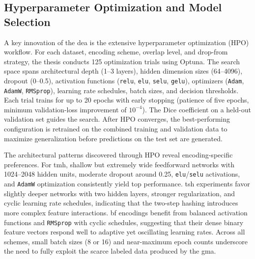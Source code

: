 \documentclass[a4paper,11pt]{scrartcl}
\begin{document}
\subsection{Hyperparameter Optimization and Model Selection}
A key innovation of the \ac{dea} is the extensive hyperparameter optimization (HPO) workflow. For each dataset, encoding scheme, overlap level, and drop-from strategy, the thesis conducts 125 optimization trials using Optuna. The search space spans architectural depth (1--3 layers), hidden dimension sizes (64--4096), dropout (0--0.5), activation functions (\texttt{relu}, \texttt{elu}, \texttt{selu}, \texttt{gelu}), optimizers (\texttt{Adam}, \texttt{AdamW}, \texttt{RMSprop}), learning rate schedules, batch sizes, and decision thresholds. Each trial trains for up to 20 epochs with early stopping (patience of five epochs, minimum validation-loss improvement of $10^{-4}$). The Dice coefficient on a held-out validation set guides the search. After HPO converges, the best-performing configuration is retrained on the combined training and validation data to maximize generalization before predictions on the test set are generated.

The architectural patterns discovered through HPO reveal encoding-specific preferences. For \ac{tmh}, shallow but extremely wide feedforward networks with 1024--2048 hidden units, moderate dropout around 0.25, \texttt{elu}/\texttt{selu} activations, and \texttt{AdamW} optimization consistently yield top performance. \ac{tsh} experiments favor slightly deeper networks with two hidden layers, stronger regularization, and cyclic learning rate schedules, indicating that the two-step hashing introduces more complex feature interactions. \ac{bf} encodings benefit from balanced activation functions and \texttt{RMSprop} with cyclic schedules, suggesting that their dense binary feature vectors respond well to adaptive yet oscillating learning rates. Across all schemes, small batch sizes (8 or 16) and near-maximum epoch counts underscore the need to fully exploit the scarce labeled data produced by the \ac{gma}.
\end{document}
